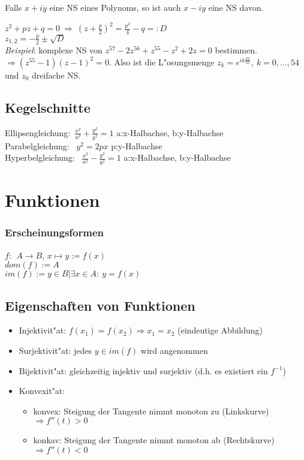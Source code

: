 \documentclass[10pt, a4paper, twocolumn]{scrartcl}
\begin{document}
Falls $x+iy$ eine NS eines Polynoms, so ist auch $x-iy$ eine NS davon.

$z^2+pz+q=0\:\Rightarrow\:(z+\frac{p}{2})^2=\frac{p^2}{4}-q=:D$\\
$z_{1,2}=-\frac{p}{2}\pm\sqrt{D}$\\
\textit{Beispiel}: komplexe NS von $z^{57}-2z^{56}+z^55-z^2+2z=0$ bestimmen. $\Rightarrow(z^{55}-1)(z-1)^2=0$. Also ist die L"osungsmenge $z_k=e^{ik\frac{2\pi}{55}},\:k=0,\ldots,54$ und $z_0$ dreifache NS.

\subsection{Kegelschnitte}

Ellipsengleichung:\ $\frac{x^2}{a^2}+\frac{y^2}{b^2}=1$ a:x-Halbachse, b:y-Halbachse\\
Parabelgleichung: \ $y^2=2px$ p:y-Halbachse\\
Hyperbelgleichung: \ $\frac{x^2}{a^2}-\frac{y^2}{b^2}=1$ a:x-Halbachse, b:y-Halbachse\\


\section{Funktionen}

\subsubsection{Erscheinungsformen}

$f:\:\:A\rightarrow B$, $x\mapsto y:=f(x)$\\
$dom(f):=A$\\
$im(f):=y\in B|\exists x \in A:\:y=f(x)$

\subsection{Eigenschaften von Funktionen}

\begin{itemize}
 \item Injektivit"at: $f(x_1)=f(x_2)\Rightarrow x_1=x_2$ (eindeutige Abbildung)
 \item Surjektivit"at: jedes $y\in im(f)$ wird angenommen
 \item Bijektivit"at: gleichzeitig injektiv und surjektiv (d.h. es existiert ein $f^{-1}$)
 \item Konvexit"at:
  \begin{itemize}
   \item konvex: Steigung der Tangente nimmt monoton zu (Linkskurve) $\Rightarrow f''(t)>0$
   \item konkav: Steigung der Tangente nimmt monoton ab (Rechtskurve) $\Rightarrow f''(t)<0$
  \end{itemize}
\end{itemize}
\end{document}
